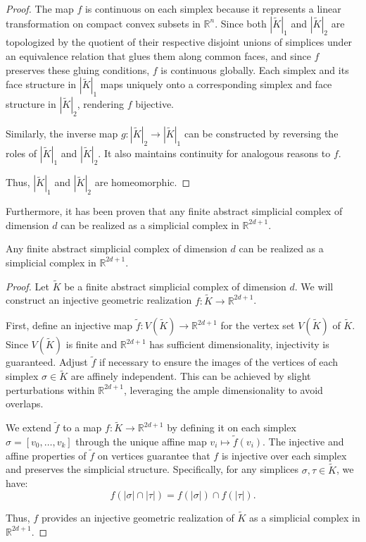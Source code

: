 \begin{proof}
    The map $f$ is continuous on each simplex because it represents a linear transformation on compact convex subsets in $\mathbb{R}^{n}$. Since both $|\tilde{K}|_1$ and $|\tilde{K}|_2$ are topologized by the quotient of their respective disjoint unions of simplices under an equivalence relation that glues them along common faces, and since $f$ preserves these gluing conditions, $f$ is continuous globally. Each simplex and its face structure in $|\tilde{K}|_1$ maps uniquely onto a corresponding simplex and face structure in $|\tilde{K}|_2$, rendering $f$ bijective.

    Similarly, the inverse map $g: |\tilde{K}|_2 \to |\tilde{K}|_1$ can be constructed by reversing the roles of $|\tilde{K}|_1$ and $|\tilde{K}|_2$. It also maintains continuity for analogous reasons to $f$.

    Thus, $|\tilde{K}|_1$ and $|\tilde{K}|_2$ are homeomorphic.
\end{proof}

Furthermore, it has been proven that any finite abstract simplicial complex of dimension $d$ can be realized as a simplicial complex in $\mathbb{R}^{2d+1}$.

\begin{theorem}
    Any finite abstract simplicial complex of dimension $d$ can be realized as a simplicial complex in $\mathbb{R}^{2d+1}$.
\end{theorem}

\begin{proof}
    Let $\tilde{K}$ be a finite abstract simplicial complex of dimension $d$. We will construct an injective geometric realization $f: \tilde{K} \to \mathbb{R}^{2d+1}$.

    First, define an injective map $\tilde{f}: V(\tilde{K}) \to \mathbb{R}^{2d+1}$ for the vertex set $V(\tilde{K})$ of $\tilde{K}$. Since $V(\tilde{K})$ is finite and $\mathbb{R}^{2d+1}$ has sufficient dimensionality, injectivity is guaranteed. Adjust $\tilde{f}$ if necessary to ensure the images of the vertices of each simplex $\sigma \in \tilde{K}$ are affinely independent. This can be achieved by slight perturbations within $\mathbb{R}^{2d+1}$, leveraging the ample dimensionality to avoid overlaps.

    We extend $\tilde{f}$ to a map $f: \tilde{K} \to \mathbb{R}^{2d+1}$ by defining it on each simplex $\sigma = [v_0, \ldots, v_k]$ through the unique affine map $v_i \mapsto \tilde{f}(v_i)$. The injective and affine properties of $\tilde{f}$ on vertices guarantee that $f$ is injective over each simplex and preserves the simplicial structure. Specifically, for any simplices $\sigma, \tau \in \tilde{K}$, we have:
    \[
        f(|\sigma| \cap |\tau|) = f(|\sigma|) \cap f(|\tau|).
    \]

    Thus, $f$ provides an injective geometric realization of $\tilde{K}$ as a simplicial complex in $\mathbb{R}^{2d+1}$.
\end{proof}

